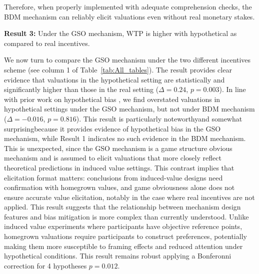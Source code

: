 \documentclass[12pt]{article}
\begin{document}
 Therefore, when properly implemented with adequate comprehension checks, the BDM mechanism can reliably elicit  valuations even without real monetary stakes.



 
\vspace{0.5cm}


\textbf{Result 3:} Under the GSO mechanism, WTP is higher with hypothetical as compared to real incentives. 

We now turn to compare the GSO mechanism under the two different incentives scheme (see column 1 of Table~\ref{tab:All_tables}). The result provides clear evidence that valuations in the hypothetical setting are statistically and significantly higher than those in the real setting (\(\Delta = 0.24\), \(p =0.003\)). 
In line with prior work on hypothetical bias \citep{penn2018understanding, fang_use_2021, ahles_testing_2024}, we find overstated valuations in hypothetical settings under the GSO mechanism, but not under BDM mechanism (\(\Delta = -0.016\), \(p =0.816\)).  
This result is particularly noteworthy\textemdash and somewhat surprising\textemdash because it provides evidence of hypothetical bias in the GSO mechanism, while Result 1 indicates no such evidence in the BDM mechanism. This is unexpected, since the GSO mechanism is a game structure obvious mechanism and is assumed to elicit valuations that more closely reflect theoretical predictions in induced value settings. This contrast implies that elicitation format matters: conclusions from induced-value designs need confirmation with homegrown values, and game obviousness alone does not ensure accurate value elicitation, notably in the case where real incentives are not applied. This result suggests that the relationship between mechanism design features and bias mitigation is more complex than currently understood. Unlike induced value experiments where participants have objective reference points, homegrown valuations require participants to construct preferences, potentially making them more susceptible to framing effects and reduced attention under hypothetical conditions. This result remains robust applying a Bonferonni correction for 4 hypotheses \(p=0.012\).
\end{document}
